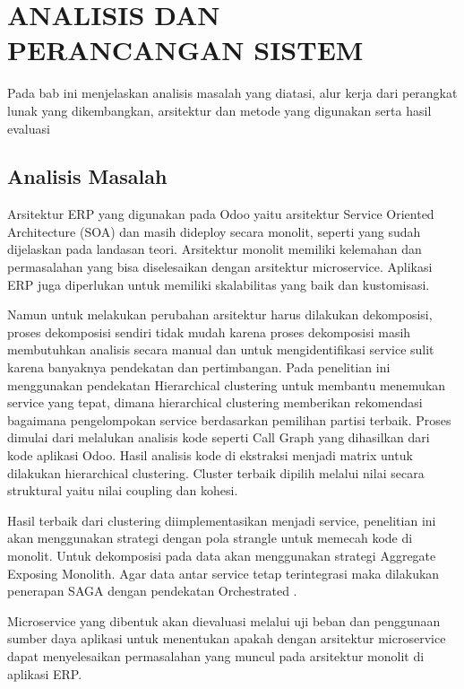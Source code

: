 \chapter{ANALISIS DAN PERANCANGAN SISTEM}
\vspace{4.5pt}

Pada bab ini menjelaskan analisis masalah yang diatasi, alur kerja dari perangkat lunak yang dikembangkan, arsitektur dan metode yang digunakan serta hasil evaluasi

\section{Analisis Masalah}
Arsitektur ERP yang digunakan pada Odoo yaitu arsitektur Service Oriented Architecture (SOA) dan masih dideploy secara monolit, seperti yang sudah dijelaskan pada landasan teori. Arsitektur monolit memiliki kelemahan dan permasalahan yang bisa diselesaikan dengan arsitektur microservice. Aplikasi ERP juga diperlukan untuk memiliki skalabilitas yang baik dan kustomisasi.

Namun untuk melakukan perubahan arsitektur harus dilakukan dekomposisi, proses dekomposisi sendiri tidak mudah karena proses dekomposisi masih membutuhkan analisis secara manual dan untuk mengidentifikasi service sulit karena banyaknya pendekatan dan pertimbangan.
Pada penelitian ini menggunakan pendekatan Hierarchical clustering untuk membantu menemukan service yang tepat, dimana hierarchical clustering memberikan rekomendasi bagaimana pengelompokan service berdasarkan pemilihan partisi terbaik.
Proses dimulai dari melalukan analisis kode seperti Call Graph yang dihasilkan dari kode aplikasi Odoo. Hasil analisis kode di ekstraksi menjadi matrix untuk dilakukan hierarchical clustering. Cluster terbaik dipilih melalui nilai secara struktural yaitu nilai coupling  dan kohesi.

Hasil terbaik dari clustering diimplementasikan menjadi service, penelitian ini akan menggunakan strategi dengan pola strangle untuk memecah kode di monolit. Untuk dekomposisi pada data akan menggunakan strategi Aggregate Exposing Monolith. Agar data antar service tetap terintegrasi maka dilakukan penerapan SAGA dengan pendekatan Orchestrated .

Microservice yang dibentuk akan dievaluasi melalui uji beban dan penggunaan sumber daya aplikasi untuk menentukan apakah dengan arsitektur microservice dapat menyelesaikan permasalahan yang muncul pada arsitektur monolit di aplikasi ERP.
\\

